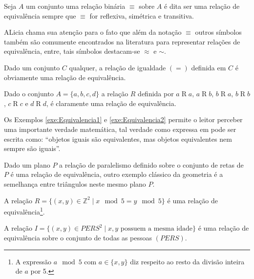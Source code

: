 \begin{definicao}\label{def:RelacaoEquivalencia}
	Seja $A$ um conjunto uma relação binária $\equiv$ sobre $A$ é dita ser uma relação de equivalência sempre que $\equiv$ for reflexiva, simétrica e transitiva.
\end{definicao}

\begin{nota}
  ALicia chama sua atenção para o fato que além da notação $\equiv$ outros símbolos também são comumente encontrados na literatura para representar relações de equivalência, entre, tais símbolos destacam-se $\approx$ e $\sim$.
\end{nota}

\begin{exemplo}\label{exe:Equivalencia1}
	Dado um conjunto $C$ qualquer, a relação de igualdade $(=)$ definida em $C$ é obviamente uma relação de equivalência.
\end{exemplo}

\begin{exemplo}\label{exe:Equivalencia2}
	Dado o conjunto $A =\{a, b, c, d\}$ a relação $R$ definida por $a \mathrel{R} a$, $a \mathrel{R} b$, $b \mathrel{R} a$, $b \mathrel{R} b$, $c \mathrel{R} c$ e $d \mathrel{R} d$, é claramente uma relação de equivalência.
\end{exemplo}

Os Exemplos \ref{exe:Equivalencia1} e \ref{exe:Equivalencia2} permite o leitor perceber uma importante verdade matemática, tal verdade como expressa em \cite{carmo2013} pode ser escrita como: ``objetos iguais são equivalentes, mas objetos equivalentes nem sempre são iguais''.

\begin{exemplo}
	Dado um plano $P$ a relação de paralelismo definido sobre o conjunto de retas de $P$ é uma relação de equivalência, outro exemplo clássico da geometria é a semelhança entre triângulos neste mesmo plano $P$.
\end{exemplo}

\begin{exemplo}
	A relação $R = \{(x, y) \in \mathbb{Z}^2 \mid x \mod 5 = y \mod 5\}$ é uma relação de equivalência\footnote{A expressão $a\mod 5$ com $a \in \{x, y\}$ diz respeito ao resto da divisão inteira de $a$ por 5.}.
\end{exemplo}

\begin{exemplo}
	A relação $I =  \{(x, y) \in PERS^2 \mid x, y \text{ possuem a mesma idade}\}$ é uma relação de equivalência sobre o conjunto de todas as pessoas $(PERS)$.
\end{exemplo}

